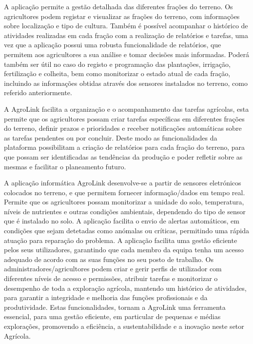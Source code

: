 \documentclass[a4paper,12pt]{report}
\begin{document}
	A aplicação permite a gestão detalhada das diferentes frações do terreno. Os agricultores podem registar e visualizar as frações do terreno, com informações sobre localização e tipo de cultura. Também é possível acompanhar o histórico de atividades realizadas em cada fração com a realização de relatórios e tarefas, uma vez que a aplicação possui uma robusta funcionalidade de relatórios, que permitem aos agricultores a sua análise e tomar decisões mais informadas. Poderá também ser útil no caso do registo e programação das plantações, irrigação, fertilização e colheita, bem como monitorizar o estado atual de cada fração, incluindo as informações obtidas através dos sensores instalados no terreno, como referido
	anteriormente.
	
	A AgroLink facilita a organização e o acompanhamento das tarefas agrícolas, esta permite que os agricultores possam criar tarefas específicas em diferentes frações do terreno, definir prazos e prioridades e receber notificações automáticas sobre as tarefas pendentes ou por concluir. Deste modo as funcionalidades da plataforma possibilitam a criação de relatórios para cada fração do terreno, para que possam ser identificadas as tendências da produção e poder refletir sobre as mesmas e facilitar o planeamento futuro.
	
	A aplicação informática AgroLink desenvolve-se a partir de sensores eletrónicos colocados no terreno, e que permitem fornecer  informação/dados em tempo real. Permite que os agricultores possam monitorizar a unidade do solo, temperatura, níveis de nutrientes e
	outras condições ambientais, dependendo do tipo de sensor que é instalado no solo. A aplicação facilita o envio de alertas automáticos, em condições que sejam detetadas como anómalas ou críticas, permitindo uma rápida atuação para reparação do problema. A aplicação facilita uma gestão eficiente pelos seus utilizadores, garantindo que cada membro da equipa tenha um acesso adequado de acordo com as suas funções no seu posto de trabalho. Os administradores/agricultores podem criar e gerir perfis de utilizador com diferentes níveis de acesso e permissões, atribuir tarefas e monitorizar o desempenho de toda a exploração agrícola, mantendo um histórico de atividades, para garantir a integridade
	e melhoria das funções profissionais e da produtividade. Estas funcionalidades, tornam a AgroLink uma ferramenta essencial, para uma gestão eficiente, em particular de pequenas e médias explorações, promovendo a eficiência, a sustentabilidade e a inovação neste setor Agrícola.
	
\end{document}
